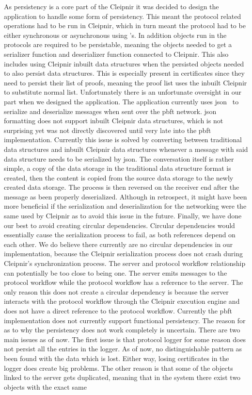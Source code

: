 As persistency is a core part of the Cleipnir it was decided to design the application to handle some form of persistency. This meant the protocol related operations had to be run in Cleipnir, which in turn meant the protocol had to be either synchronous or asynchronous using 's. In addition objects run in the protocols are required to be persistable, meaning the objects needed to get a serializer function and deserializer function connected to Cleipnir. This also includes using Cleipnir inbuilt data structures when the persisted objects needed to also persist data structures. This is especially present in certificates since they need to persist their list of proofs, meaning the proof list uses the inbuilt Cleipnir  to substitute normal list. Unfortunately there is an unfortunate oversight in our part when we designed the application. The application currently uses \ac{json}~\cite{WEB:NewJSON} to serialize and deserialize messages when sent over the \ac{pbft} network. \ac{json} formatting does not support inbuilt Cleipnir data structures, which is not surprising yet was not directly discovered until very late into the \ac{pbft} implementation. Currently this issue is solved by converting between traditional data structures and inbuilt Cleipnir data structures whenever a message with said data structure needs to be serialized by \ac{json}. The conversation itself is rather simple, a copy of the data storage in the traditional data structure format is created, then the content is copied from the source data storage to the newly created data storage. The process is then reversed on the receiver end after the message as been properly deserialized. Although in retrospect, it might have been more beneficial if the serialization and deserialization for the networking were the same used by Cleipnir as to avoid this issue in the future. Finally, we have done our best to avoid creating circular dependencies. Circular dependencies would essentially cause the serialization process to fail, as both references depend on each other. We do believe there currently are no circular dependencies in our implementation, because the Cleipnir serialization process does not crash during Cleipnir's synchronization process. The server and protocol workflow relationship can potentially be too close to being one. The server emits messages to the protocol workflow while the protocol workflow has a reference to the server. The only reason this does not create a circular dependency is because the server interacts with the protocol workflow through the Cleipnir execution engine and does not have a direct reference to the protocol workflow. Currently the \ac{pbft} implementation does not currently support functional persistency. The reason for as to why the persistency  does not work completely is uncertain. There are two main issues as of now. The first issue is that protocol logger for some reason does not persist all the entries in the logger. As of now, no distinguishable pattern as been found with the data which is lost. Either way, losing certificates in the logger does create big problems. The other reason is that some of the  objects linked to the server gets duplicated, meaning that in the system there exist two  objects with the exact same 